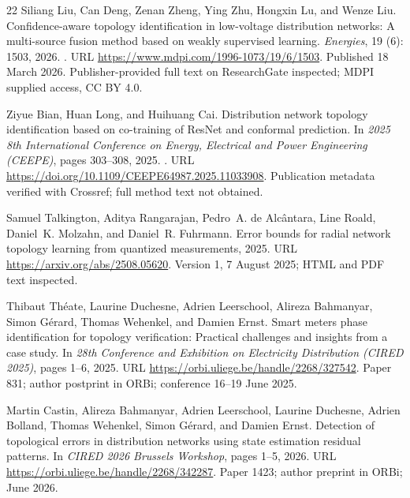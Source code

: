 \documentclass[UTF8,11pt,fontset=fandol,openany,oneside]{ctexbook}
\theoremstyle{definition}
\theoremstyle{remark}
\numberwithin{equation}{chapter}
\begin{document}
\begin{thebibliography}{22}
Siliang Liu, Can Deng, Zenan Zheng, Ying Zhu, Hongxin Lu, and Wenze Liu.
\newblock Confidence-aware topology identification in low-voltage distribution
  networks: A multi-source fusion method based on weakly supervised learning.
\newblock \emph{Energies}, 19 (6): 1503, 2026.
\newblock {}.
\newblock URL \url{https://www.mdpi.com/1996-1073/19/6/1503}.
\newblock Published 18 March 2026. Publisher-provided full text on ResearchGate
  inspected; MDPI supplied access, CC BY 4.0.

Ziyue Bian, Huan Long, and Huihuang Cai.
\newblock Distribution network topology identification based on co-training of
  {ResNet} and conformal prediction.
\newblock In \emph{2025 8th International Conference on Energy, Electrical and
  Power Engineering (CEEPE)}, pages 303--308, 2025.
\newblock {}.
\newblock URL \url{https://doi.org/10.1109/CEEPE64987.2025.11033908}.
\newblock Publication metadata verified with Crossref; full method text not
  obtained.

Samuel Talkington, Aditya Rangarajan, Pedro~A. {de Alc{\^a}ntara}, Line Roald,
  Daniel~K. Molzahn, and Daniel~R. Fuhrmann.
\newblock Error bounds for radial network topology learning from quantized
  measurements, 2025.
\newblock URL \url{https://arxiv.org/abs/2508.05620}.
\newblock Version 1, 7 August 2025; HTML and PDF text inspected.

Thibaut Th{\'e}ate, Laurine Duchesne, Adrien Leerschool, Alireza Bahmanyar,
  Simon G{\'e}rard, Thomas Wehenkel, and Damien Ernst.
\newblock Smart meters phase identification for topology verification:
  Practical challenges and insights from a case study.
\newblock In \emph{28th Conference and Exhibition on Electricity Distribution
  (CIRED 2025)}, pages 1--6, 2025.
\newblock URL \url{https://orbi.uliege.be/handle/2268/327542}.
\newblock Paper 831; author postprint in ORBi; conference 16--19 June 2025.

Martin Castin, Alireza Bahmanyar, Adrien Leerschool, Laurine Duchesne, Adrien
  Bolland, Thomas Wehenkel, Simon G{\'e}rard, and Damien Ernst.
\newblock Detection of topological errors in distribution networks using state
  estimation residual patterns.
\newblock In \emph{CIRED 2026 Brussels Workshop}, pages 1--5, 2026.
\newblock URL \url{https://orbi.uliege.be/handle/2268/342287}.
\newblock Paper 1423; author preprint in ORBi; June 2026.


\end{thebibliography}
\end{document}
